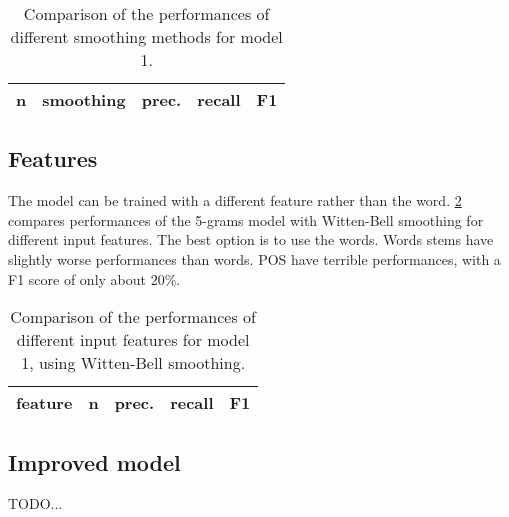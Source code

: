 \begin{table}[t!]
	\centering
    \begin{tabular}{ l l l l l }
    	\toprule
    		n & smoothing & prec. & recall & F1 \\
    	\midrule
            
    	\bottomrule
	\end{tabular}
    \caption{Comparison of the performances of different smoothing methods for model 1.}
	\label{tab:v1-smoothing}
\end{table}

\subsection{Features}
The model can be trained with a different feature rather than the word.
\cref{tab:v1-features} compares performances of the 5-grams model with Witten-Bell smoothing for different input features.
The best option is to use the words.
Words stems have slightly worse performances than words.
\ac{POS} have terrible performances, with a F1 score of only about $20\%$.

\begin{table}
	\centering
    \begin{tabular}{ l l l l l }
    	\toprule
    		feature & n & prec. & recall & F1 \\
    	\midrule
            
    	\bottomrule
	\end{tabular}
    \caption{Comparison of the performances of different input features for model 1, using Witten-Bell smoothing.}
	\label{tab:v1-features}
\end{table}

\subsection{Improved model}
TODO...
